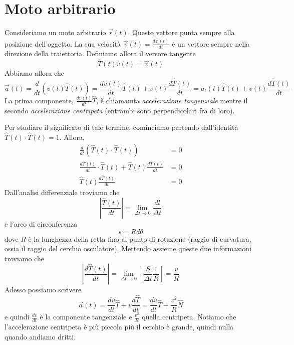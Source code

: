 \documentclass[a4paper]{article}
\begin{document}

\pagebreak

\section{Moto arbitrario}

Consideriamo un moto arbitrario \(\vec{r}(t)\). Questo vettore punta sempre alla posizione dell'oggetto.
La sua velocità \(\vec{v}(t) = \frac{d\vec{r}(t)}{dt}\) è un vettore sempre nella direzione della traiettoria.
Definiamo allora il versore tangente
\[
    \hat{T}(t) v(t) = \vec{v}(t)
\]
Abbiamo allora che
\[
    \vec{a}(t) = \frac{d}{dt} \left(v(t)\hat{T}(t)\right) = \frac{dv(t)}{dt}\hat{T}(t) + v(t)\frac{d\hat{T}(t)}{dt} = a_t(t)\hat{T}(t) + v(t)\frac{d\hat{T}(t)}{dt}
\]
La prima componente, \(\frac{dv(t)}{dt}\hat{T}\), è chiamamta \textit{accelerazione tangenziale}
mentre il secondo \textit{accelerazione centripeta} (entrambi sono perpendicolari fra di loro).

Per studiare il significato di tale termine, cominciamo partendo dall'identità \(\hat{T}(t) \cdot \hat{T}(t) = 1\).
Allora,
\begin{align*}
    \frac{d}{dt} \left( \hat{T}(t) \cdot \hat{T}(t) \right) &= 0 \\
    \frac{d\hat{T}(t)}{dt} \cdot \hat{T}(t) + \hat{T}(t)\frac{d\hat{T}(t)}{dt} &= 0 \\
    \hat{T}(t)\frac{d\hat{T}(t)}{dt} &= 0 
\end{align*}
Dall'analisi differenziale troviamo che
\[
    \left|\frac{\hat{T}(t)}{dt}\right| = \lim_{\Delta t \to 0} \frac{dl}{\Delta t}
\]
e l'arco di circonferenza
\[
    s = Rd\theta
\]
dove \(R\) è la lunghezza della retta fino al punto di rotazione (raggio di curvatura, ossia il raggio del cerchio osculatore).
Mettendo assieme queste due informazioni troviamo che
\[
    \left|\frac{d\hat{T}(t)}{dt}\right| = \lim_{\Delta t \to 0} \left[\frac{S}{\Delta t} \frac{1}{R}\right] = \frac{v}{R}
\]
Adesso possiamo scrivere
\[
    \vec{a}(t) = \frac{dv}{dt}\hat{T} + v\frac{d\hat{T}}{dt} = \frac{dv}{dt}\hat{T} + \frac{v^2}{R} \hat{N}
\]
e quindi \(\frac{dv}{dt}\) è la componente tangenziale e \(\frac{v^2}{R}\) quella centripeta.
Notiamo che l'accelerazione centripeta è più piccola più il cerchio è grande, quindi nulla
quando andiamo dritti.
\end{document}
